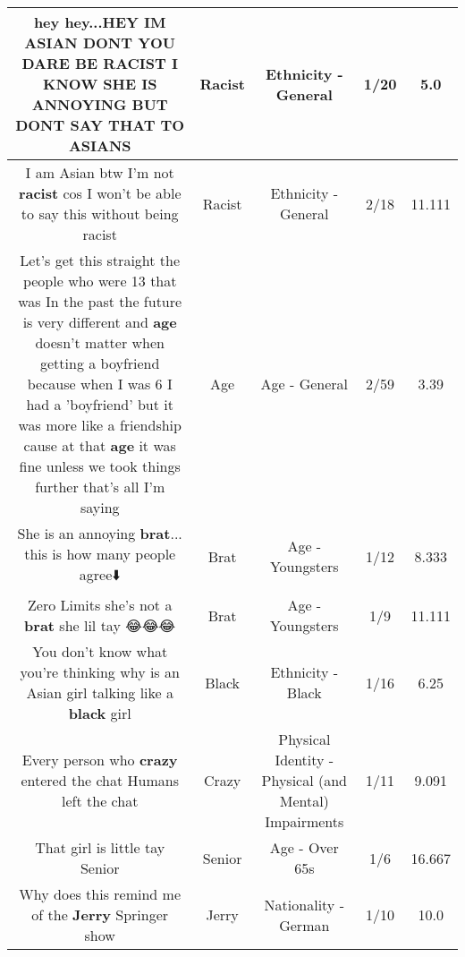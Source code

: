 \documentclass[11pt]{article}
\newlength\mylength
\begin{document}
\begin{center}
\begin{longtable}{|C{.65\mylength}|C{.30\mylength}|C{.12\mylength}|C{.12\mylength}|C{.12\mylength}|}
  \small hey hey...HEY IM ASIAN DONT YOU DARE BE \textbf{RACIST} I KNOW SHE IS ANNOYING BUT DONT SAY THAT TO ASIANS\normalsize   & Racist & Ethnicity - General & 1/20 & 5.0 \\  \hline
  \small I am Asian btw I'm not \textbf{racist} cos I won't be able to say this without being racist\normalsize   & Racist & Ethnicity - General & 2/18 & 11.111 \\  \hline
  \small Let's get this straight the people who were 13 that was In the past the future is very different and \textbf{age} doesn't matter when getting a boyfriend because when I was 6 I had a 'boyfriend' but it was more like a friendship cause at that \textbf{age} it was fine unless we took things further that's all I'm saying\normalsize   & Age & Age - General & 2/59 & 3.39 \\  \hline
  \small She is an annoying \textbf{brat}... this is how many people agree⬇️\normalsize   & Brat & Age - Youngsters & 1/12 & 8.333 \\  \hline
  \small Zero Limits she's not a \textbf{brat} she lil tay 😂😂😂\normalsize   & Brat & Age - Youngsters & 1/9 & 11.111 \\  \hline
  \small You don't know what you're thinking why is an Asian girl talking like a \textbf{black} girl\normalsize   & Black & Ethnicity - Black & 1/16 & 6.25 \\  \hline
  \small Every person who \textbf{crazy} entered the chat Humans left the chat\normalsize   & Crazy & Physical Identity - Physical (and Mental) Impairments & 1/11 & 9.091 \\  \hline
  \small That girl is little tay Senior\normalsize   & Senior & Age - Over 65s & 1/6 & 16.667 \\  \hline
  \small Why does this remind me of the \textbf{Jerry} Springer show\normalsize   & Jerry & Nationality - German & 1/10 & 10.0 \\  \hline

\end{longtable}
\end{center}
\end{document}
